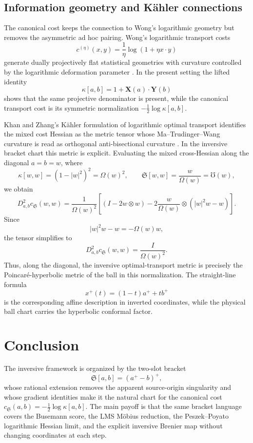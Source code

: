 \documentclass[11pt]{article}
\newcommand{\norm}[1]{\left|#1\right|}
\newcommand{\cs}{c_{\mathfrak S}}
\newcommand{\UU}{\mho}
\newcommand{\Sbr}[2]{\mathfrak S[#1,#2]}
\newcommand{\kap}[2]{\kappa[#1,#2]}
\newcommand{\Om}{\Omega}
\newcommand{\Xlift}{\mathbf X}
\newcommand{\Ylift}{\mathbf Y}
\begin{document}
\subsection{Information geometry and K\"ahler connections}

The canonical cost keeps the connection to Wong's logarithmic geometry but removes the asymmetric ad hoc pairing.  Wong's logarithmic transport costs
\[
    c^{(\eta)}(x,y)=\frac1\eta\log(1+\eta x\cdot y)
\]
generate dually projectively flat statistical geometries with curvature controlled by the logarithmic deformation parameter \cite{Wong2018}.  In the present setting the lifted identity
\[
    \kap{a}{b}=1+\Xlift(a)\cdot\Ylift(b)
\]
shows that the same projective denominator is present, while the canonical transport cost is its symmetric normalization $-\frac12\log\kap{a}{b}$.

Khan and Zhang's K\"ahler formulation of logarithmic optimal transport identifies the mixed cost Hessian as the metric tensor whose Ma--Trudinger--Wang curvature is read as orthogonal anti-bisectional curvature \cite{KhanZhang2020}.  In the inversive bracket chart this metric is explicit.  Evaluating the mixed cross-Hessian along the diagonal $a=b=w$, where
\[
    \kap{w}{w}=(1-\norm w^2)^2=\Om(w)^2,
    \qquad
    \Sbr{w}{w}=\frac{w}{\Om(w)}=\UU(w),
\]
we obtain
\[
    D^2_{a,b}\cs(w,w)
    =
    \frac{1}{\Om(w)^2}
    \left[
        \left(I-2w\otimes w\right)
        -2\frac{w}{\Om(w)}\otimes\left(\norm w^2w-w\right)
    \right].
\]
Since
\[
    \norm w^2w-w=-\Om(w)w,
\]
the tensor simplifies to
\[
    \boxed{
    D^2_{a,b}\cs(w,w)=\frac{I}{\Om(w)^2}.
    }
\]
Thus, along the diagonal, the inversive optimal-transport metric is precisely the Poincar\'e-hyperbolic metric of the ball in this normalization.  The straight-line formula
\[
    x^+(t)=(1-t)a^+ + tb^+
\]
is the corresponding affine description in inverted coordinates, while the physical ball chart carries the hyperbolic conformal factor.

\section{Conclusion}

The inversive framework is organized by the two-slot bracket
\[
    \Sbr{a}{b}=(a^+-b)^+,
\]
whose rational extension removes the apparent source-origin singularity and whose gradient identities make it the natural chart for the canonical cost $\cs(a,b)=-\frac12\log\kap{a}{b}$.  The main payoff is that the same bracket language covers the Busemann score, the LMS Möbius reduction, the Peszek--Poyato logarithmic Hessian limit, and the explicit inversive Brenier map without changing coordinates at each step.
\end{document}
